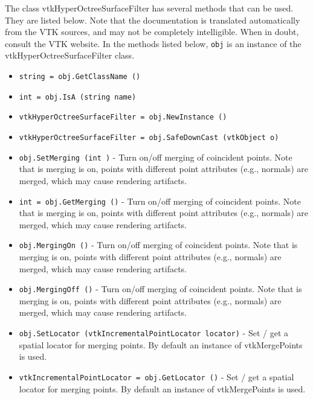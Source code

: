 The class vtkHyperOctreeSurfaceFilter has several methods that can be used.
  They are listed below.
Note that the documentation is translated automatically from the VTK sources,
and may not be completely intelligible.  When in doubt, consult the VTK website.
In the methods listed below, \verb|obj| is an instance of the vtkHyperOctreeSurfaceFilter class.
\begin{itemize}
\item  \verb|string = obj.GetClassName ()|

\item  \verb|int = obj.IsA (string name)|

\item  \verb|vtkHyperOctreeSurfaceFilter = obj.NewInstance ()|

\item  \verb|vtkHyperOctreeSurfaceFilter = obj.SafeDownCast (vtkObject o)|

\item  \verb|obj.SetMerging (int )| -  Turn on/off merging of coincident points. Note that is merging is
 on, points with different point attributes (e.g., normals) are merged,
 which may cause rendering artifacts.

\item  \verb|int = obj.GetMerging ()| -  Turn on/off merging of coincident points. Note that is merging is
 on, points with different point attributes (e.g., normals) are merged,
 which may cause rendering artifacts.

\item  \verb|obj.MergingOn ()| -  Turn on/off merging of coincident points. Note that is merging is
 on, points with different point attributes (e.g., normals) are merged,
 which may cause rendering artifacts.

\item  \verb|obj.MergingOff ()| -  Turn on/off merging of coincident points. Note that is merging is
 on, points with different point attributes (e.g., normals) are merged,
 which may cause rendering artifacts.

\item  \verb|obj.SetLocator (vtkIncrementalPointLocator locator)| -  Set / get a spatial locator for merging points. By
 default an instance of vtkMergePoints is used.

\item  \verb|vtkIncrementalPointLocator = obj.GetLocator ()| -  Set / get a spatial locator for merging points. By
 default an instance of vtkMergePoints is used.


\end{itemize}
